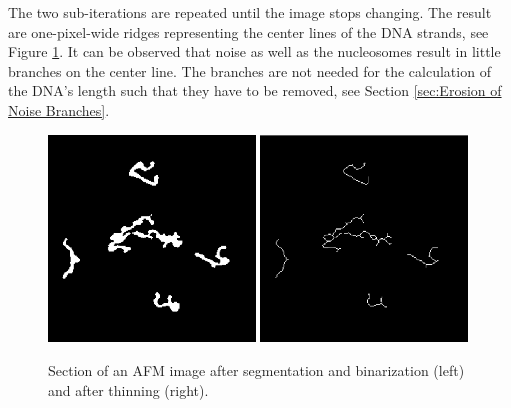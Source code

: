 \documentclass{article}
\begin{document}
The two sub-iterations are repeated until the image stops changing. The result are one-pixel-wide ridges representing the center lines of the DNA strands, see Figure \ref{fig: thinning}. It can be observed that noise as well as the nucleosomes result in little branches on the center line. The branches are not needed for the calculation of the DNA's length such that they have to be removed, see Section \ref{sec:Erosion of Noise Branches}.

\begin{figure}[htb]
\centering
\includegraphics[width = 0.49\textwidth]{bin.png}
\includegraphics[width = 0.49\textwidth]{thinned.png}
\caption{Section of an AFM image after segmentation and binarization (left) and after thinning (right).}
\label{fig: thinning}
\end{figure}
\end{document}
